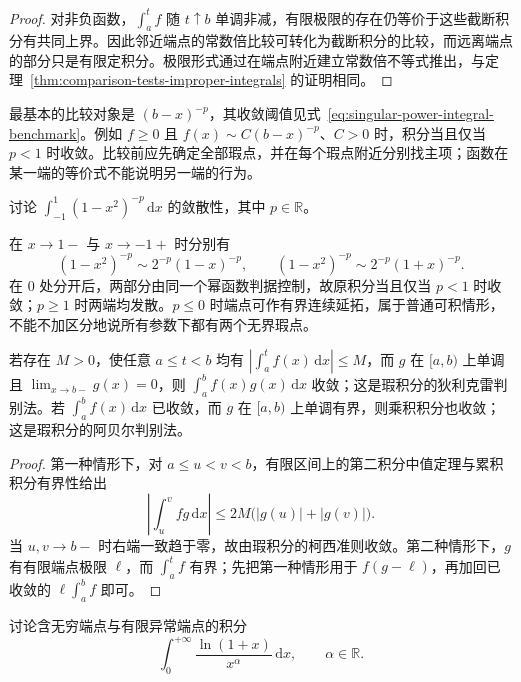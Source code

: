 \begin{proof}
对非负函数，$\int_a^t f$ 随 $t\uparrow b$ 单调非减，有限极限的存在仍等价于这些截断积分有共同上界。因此邻近端点的常数倍比较可转化为截断积分的比较，而远离端点的部分只是有限定积分。极限形式通过在端点附近建立常数倍不等式推出，与定理~\ref{thm:comparison-tests-improper-integrals} 的证明相同。
\end{proof}

最基本的比较对象是 $(b-x)^{-p}$，其收敛阈值见式~\eqref{eq:singular-power-integral-benchmark}。例如 $f\geq0$ 且 $f(x)\sim C(b-x)^{-p}$、$C>0$ 时，积分当且仅当 $p<1$ 时收敛。比较前应先确定全部瑕点，并在每个瑕点附近分别找主项；函数在某一端的等价式不能说明另一端的行为。

\begin{example}
\label{ex:two-endpoint-singular-power-integral}
讨论 $\int_{-1}^1(1-x^2)^{-p}\,\mathrm{d}x$ 的敛散性，其中 $p\in\mathbb{R}$。
\end{example}

\begin{solve}
在 $x\to1-$ 与 $x\to-1+$ 时分别有
\[
    (1-x^2)^{-p}\sim2^{-p}(1-x)^{-p},\qquad
    (1-x^2)^{-p}\sim2^{-p}(1+x)^{-p}.
\]
在 $0$ 处分开后，两部分由同一个幂函数判据控制，故原积分当且仅当 $p<1$ 时收敛；$p\geq1$ 时两端均发散。$p\leq0$ 时端点可作有界连续延拓，属于普通可积情形，不能不加区分地说所有参数下都有两个无界瑕点。
\end{solve}

\begin{theorem}[瑕积分的狄利克雷与阿贝尔判别法]
\label{thm:dirichlet-abel-singular-integrals}
若存在 $M>0$，使任意 $a\leq t<b$ 均有 $|\int_a^t f(x)\,\mathrm{d}x|\leq M$，而 $g$ 在 $[a,b)$ 上单调且 $\lim_{x\to b-}g(x)=0$，则 $\int_a^b f(x)g(x)\,\mathrm{d}x$ 收敛；这是瑕积分的狄利克雷判别法。若 $\int_a^b f(x)\,\mathrm{d}x$ 已收敛，而 $g$ 在 $[a,b)$ 上单调有界，则乘积积分也收敛；这是瑕积分的阿贝尔判别法。
\end{theorem}

\begin{proof}
第一种情形下，对 $a\leq u<v<b$，有限区间上的第二积分中值定理与累积积分有界性给出
\[
    \left|\int_u^v fg\,\mathrm{d}x\right|
    \leq2M\bigl(|g(u)|+|g(v)|\bigr).
\]
当 $u,v\to b-$ 时右端一致趋于零，故由瑕积分的柯西准则收敛。第二种情形下，$g$ 有有限端点极限 $\ell$，而 $\int_a^t f$ 有界；先把第一种情形用于 $f(g-\ell)$，再加回已收敛的 $\ell\int_a^b f$ 即可。
\end{proof}

\begin{example}
\label{ex:mixed-logarithmic-improper-integral}
讨论含无穷端点与有限异常端点的积分
\[
    \int_0^{+\infty}\frac{\ln(1+x)}{x^\alpha}\,\mathrm{d}x,
    \qquad\alpha\in\mathbb{R}.
\]
\end{example}

